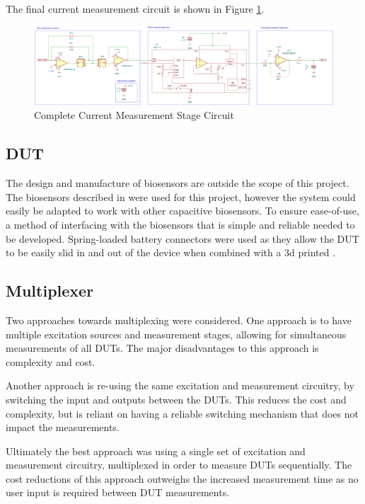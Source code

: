 The final current measurement circuit is shown in Figure \ref{fig:imeas_stage_circuit}.

\begin{figure}[H]
    \centering
    \includegraphics[width=\textwidth]{IMeasSchem.png}
    \caption{Complete Current Measurement Stage Circuit}
    \label{fig:imeas_stage_circuit}
\end{figure}

\subsection{DUT}
The design and manufacture of biosensors are outside the scope of this project. The biosensors described in \cite{ebrahimDevelopmentBiosensorEarly2023} were used for this project, however the system could easily be adapted to work with other capacitive biosensors. To ensure ease-of-use, a method of interfacing with the biosensors that is simple and reliable needed to be developed. Spring-loaded battery connectors were used as they allow the DUT to be easily slid in and out of the device when combined with a 3d printed .

\subsection{Multiplexer}
Two approaches towards multiplexing were considered. One approach is to have multiple excitation sources and measurement stages, allowing for simultaneous measurements of all \acp{DUT}.  The major disadvantages to this approach is complexity and cost.

Another approach is re-using the same excitation and measurement circuitry, by switching the input and outputs between the \acp{DUT}. This reduces the cost and complexity, but is reliant on having a reliable switching mechanism that does not impact the measurements.

Ultimately the best approach was using a single set of excitation and measurement circuitry, multiplexed in order to measure \acp{DUT} sequentially. The cost reductions of this approach outweighs the increased measurement time as no user input is required between \ac{DUT} measurements.

